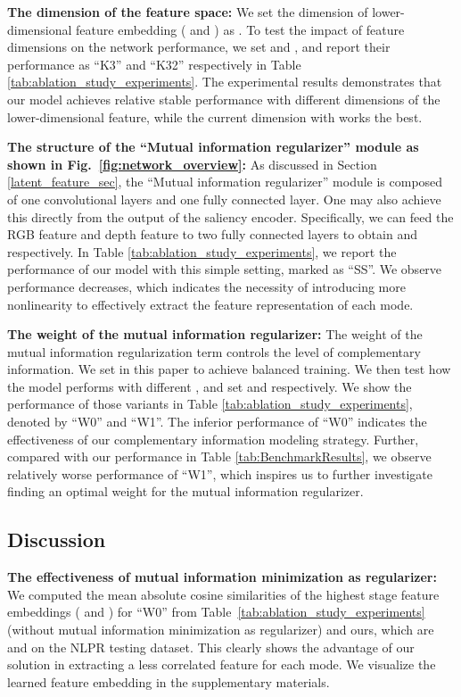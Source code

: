 \documentclass[10pt,twocolumn,letterpaper]{article}
\begin{document}
\noindent\textbf{The dimension of the feature space:} We set the dimension of lower-dimensional feature embedding ( and ) as . To test the impact of feature dimensions on the network performance, we set  and , and report their performance as \enquote{K3} and \enquote{K32} respectively in Table \ref{tab:ablation_study_experiments}. The experimental results demonstrates that our model achieves relative stable performance with different dimensions of the lower-dimensional feature, while the current dimension with  works the best.




\noindent\textbf{The structure of the \enquote{Mutual information regularizer} module as shown in Fig.~\ref{fig:network_overview}:} As discussed in Section \ref{latent_feature_sec}, the \enquote{Mutual information regularizer} module is composed of one  convolutional layers
and one fully connected layer. One may also achieve this directly from the output of the saliency encoder. Specifically, we can feed the RGB feature and depth feature to two fully connected layers to obtain  and  respectively. 
In Table \ref{tab:ablation_study_experiments}, we report the performance of our model with this simple setting, marked as \enquote{SS}. 
We observe
performance decreases, which indicates the
necessity of introducing more nonlinearity to effectively extract the feature representation of each mode.




\noindent\textbf{The weight of the mutual information regularizer:} The weight  of the mutual information regularization term controls the level of complementary information. We set  in this paper to achieve balanced training. We then test how the model performs with different
, and set  and  respectively. We show the performance of those variants in Table \ref{tab:ablation_study_experiments}, denoted by \enquote{W0} and \enquote{W1}. The inferior performance of \enquote{W0} indicates the effectiveness of our complementary information modeling strategy. Further, compared with our performance in Table \ref{tab:BenchmarkResults}, we observe relatively worse performance of \enquote{W1}, which inspires us to further investigate finding an optimal weight for the mutual information regularizer.



 


\subsection{Discussion}
\label{model_discussion}
\noindent\textbf{The effectiveness of mutual information minimization as regularizer:}
We computed the mean absolute cosine similarities of the highest stage feature embeddings ( and ) for \enquote{W0} from Table~\ref{tab:ablation_study_experiments} (without mutual information minimization as regularizer) and ours,
which are  and 
on the NLPR testing dataset. This clearly shows the advantage of our solution in extracting a less correlated feature for each mode. We visualize the learned feature embedding in the supplementary materials.
\end{document}
